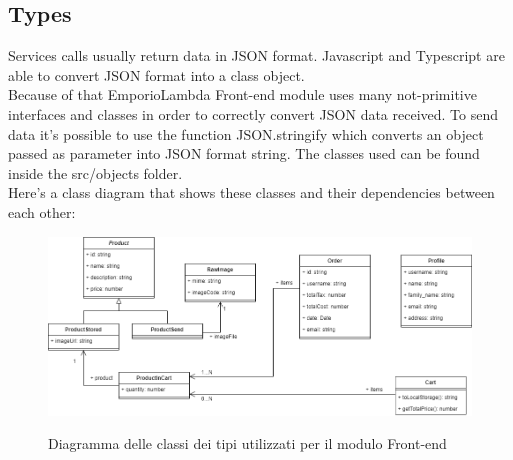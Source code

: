 \subsection{Types}
Services calls usually return data in JSON format. Javascript and Typescript are able to convert JSON format into a class object.\\
Because of that EmporioLambda Front-end module uses many not-primitive interfaces and classes in order to correctly convert JSON data received. To send data it's possible to use the function JSON.stringify which converts an object passed as parameter into JSON format string. The classes used can be found inside the src/objects folder.\\ Here's a class diagram that shows these classes and their dependencies between each other:
\vspace{0.5cm}
\begin{figure}[H]
\centering
\includegraphics[scale=0.45]{res/Architettura/Frontend/img/class_frontend_types}\\
\caption{Diagramma delle classi dei tipi utilizzati per il modulo Front-end}
\end{figure}